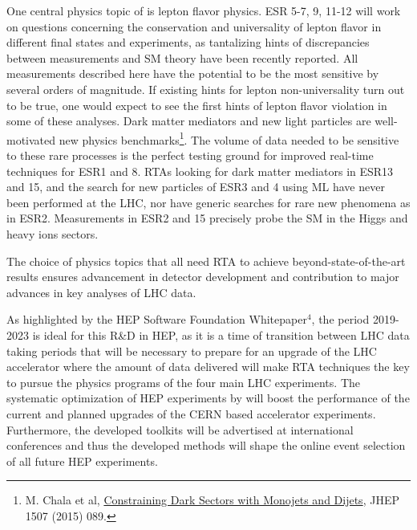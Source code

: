 One central physics topic of \acronym is lepton flavor physics.
ESR 5-7, 9, 11-12 will work on questions concerning the conservation and universality of lepton flavor in different final states and experiments, as tantalizing hints of discrepancies between measurements and SM theory have been recently reported. 
All measurements described here have the potential to be the most sensitive by several orders of magnitude. 
If existing hints for lepton non-universality turn out to be true, one would expect to see the first hints of lepton flavor violation in some of these analyses. 
Dark matter mediators and new light particles are well-motivated new physics benchmarks\footnote{M. Chala et al, \href{http://arxiv.org/abs/1503.05916}{Constraining Dark Sectors with Monojets and Dijets}, JHEP 1507 (2015) 089.}.
The volume of data needed to be sensitive to these rare processes is the perfect testing ground for improved real-time techniques for ESR1 and 8.  
RTAs looking for dark matter mediators in ESR13 and 15, and the search for new particles of ESR3 and 4 using ML have never been performed at the LHC, nor have generic searches for rare new phenomena as in ESR2.
Measurements in ESR2 and 15 precisely probe the SM in the Higgs and heavy ions sectors. 

The choice of physics topics that all need RTA to achieve beyond-state-of-the-art results ensures advancement in detector development and contribution to major advances in key analyses of LHC data.

As highlighted by the HEP Software Foundation Whitepaper$^{4}$, the period 2019-2023 is ideal for this R\&D in HEP, as it is a time of transition between LHC data taking periods that will be necessary to prepare for an upgrade of the LHC accelerator where the amount of data delivered will make RTA techniques  the key to pursue the physics programs of the four main LHC experiments.
The systematic optimization of HEP experiments by \acronym will boost the performance of the current and planned upgrades of the CERN based accelerator experiments.
Furthermore, the developed toolkits will be advertised at international conferences and thus the developed methods will shape the online event selection of all future HEP experiments. 

